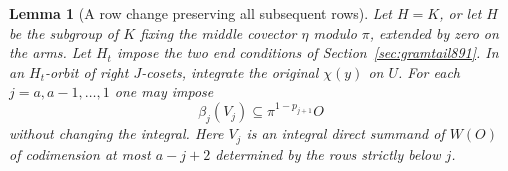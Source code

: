 \documentclass[a4paper,11pt]{article}
\newtheorem{lemma}[proposition]{Lemma}
\theoremstyle{definition}
\theoremstyle{remark}
\numberwithin{equation}{section}
\begin{document}
\begin{lemma}[A row change preserving all subsequent rows]
\leavevmode\label{lem:rowshear895}
Let \(H=K\), or let \(H\) be the subgroup of \(K\) fixing
the middle covector \(\eta\) modulo \(\pi\), extended by zero
on the arms. Let \(H_t\) impose the two end conditions of
Section~\ref{sec:gramtail891}. In an \(H_t\)-orbit of right
\(J\)-cosets, integrate the original \(\chi(y)\) on \(U\).
For each \(j=a,a-1,\ldots,1\) one may impose
\begin{equation}
        \beta_j(V_j)\subseteq\pi^{1-p_{j+1}}O
        \label{eq:rowtest895}
\end{equation}
without changing the integral. Here \(V_j\) is an integral direct
summand of \(W(O)\) of codimension at most \(a-j+2\) determined
by the rows strictly below \(j\).
\end{lemma}
\end{document}
